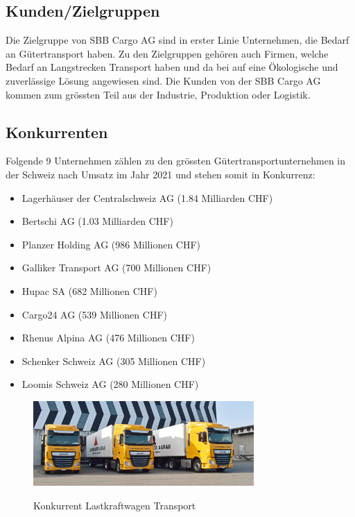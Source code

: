 \documentclass{article}
\begin{document}
\subsection{Kunden/Zielgruppen}

Die Zielgruppe von SBB Cargo AG sind in erster Linie Unternehmen, die Bedarf an Gütertransport haben.
Zu den Zielgruppen gehören auch Firmen, welche Bedarf an Langstrecken Transport haben und da bei auf eine Ökologische und zuverlässige Lösung angewiesen sind.
Die Kunden von der SBB Cargo AG kommen zum grössten Teil aus der Industrie, Produktion oder Logistik.

\cleardoublepage
\subsection{Konkurrenten}
Folgende 9 Unternehmen zählen zu den grössten Gütertransportunternehmen in der Schweiz nach Umsatz im Jahr 2021 und stehen somit in Konkurrenz:
\begin{itemize}
\item Lagerhäuser der Centralschweiz AG (1.84 Milliarden CHF)
\item Bertschi AG (1.03 Milliarden CHF)
\item Planzer Holding AG (986 Millionen CHF)
\item Galliker Transport AG (700 Millionen CHF)
\item Hupac SA (682 Millionen CHF)
\item Cargo24 AG (539 Millionen CHF)
\item Rhenus Alpina AG (476 Millionen CHF)
\item Schenker Schweiz AG (305 Millionen CHF)
\item Loomis Schweiz AG (280 Millionen CHF)
\end{itemize}
\parencite[o. S.]{groessteUnternehmenGuetertransport}

\begin{figure}[htbp] %
    \centering
    \includegraphics[width=0.75\textwidth]{konkurenz} %
    \caption{Konkurrent Lastkraftwagen Transport}\parencite[o. S.]{konkurenzBild}
    \label{fig:bildlabel5}
\end{figure}
\end{document}
